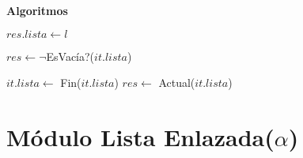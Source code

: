 \documentclass[10pt, a4paper]{article}
\let\TipoVariable=\texttt
\let\ModificadorArgumento=\textbf
\newcommand{\In}[2]{\ModificadorArgumento{in} \ensuremath{#1}\,: \TipoVariable{#2}\xspace}
\newcommand{\Inout}[2]{\ModificadorArgumento{in/out} \ensuremath{#1}\,: \TipoVariable{#2}\xspace}
\newenvironment{Servicios Usados}{%
  \vspace*{2ex}
  \noindent\textbf{\Large Servicios Usados}%
  \vspace*{2ex}
}{}
\newenvironment{Algoritmos}{%
  \vspace*{2ex}%
  \noindent\textbf{\Large Algoritmos}%
  \vspace*{2ex}%
}{}
\newcommand{\DRef}{\ensuremath{\rightarrow}}
\begin{document}
\begin{Algoritmos}

\begin{algorithm}[H]
\caption*{iCrearIterador(\In{l}{lista($\alpha$)}) $\DRef res$ : \TipoVariable{iteradorUni($\alpha$)}}
\begin{algorithmic}[1]
	\State $res.lista \gets l$
\end{algorithmic}
\end{algorithm}

\begin{algorithm}[H]
\caption*{iHayMas?(\In{it}{iteradorUni($\alpha$)}) $\DRef res$ : \TipoVariable{Bool}}
\begin{algorithmic}[1]
	\State $res \gets \neg $EsVac\'ia?($it.lista$)
\end{algorithmic}
\end{algorithm}

\begin{algorithm}[H]
\caption*{iSiguiente(\Inout{it}{iteradorUni($\alpha$)}) $\DRef res$ : \TipoVariable{$\alpha$}}
\begin{algorithmic}[1]
	\State $it.lista \gets$ Fin($it.lista$)
	\State $res \gets$ Actual($it.lista$)
\end{algorithmic}
\end{algorithm}

\end{Algoritmos}

\section{Módulo Lista Enlazada($\alpha$)}
\end{document}
